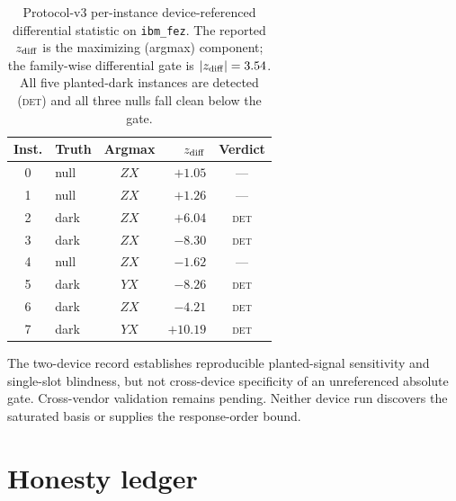 \documentclass[aps,prl,onecolumn,superscriptaddress,nofootinbib]{revtex4-2}
\begin{document}
\begin{table}[t]
\caption{Protocol-v3 per-instance device-referenced differential statistic on \texttt{ibm\_fez}.  The reported $z_{\rm diff}$ is the maximizing (argmax) component; the family-wise differential gate is $|z_{\rm diff}|=3.54$.  All five planted-dark instances are detected (\textsc{det}) and all three nulls fall clean below the gate.}
\label{tab:fez-v3}
\scriptsize
\begin{ruledtabular}
\begin{tabular}{clcrc}
Inst. & Truth & Argmax & $z_{\rm diff}$ & Verdict\\
\hline
0 & null & $ZX$ & $+1.05$ & ---\\
1 & null & $ZX$ & $+1.26$ & ---\\
2 & dark & $ZX$ & $+6.04$ & \textsc{det}\\
3 & dark & $ZX$ & $-8.30$ & \textsc{det}\\
4 & null & $ZX$ & $-1.62$ & ---\\
5 & dark & $YX$ & $-8.26$ & \textsc{det}\\
6 & dark & $ZX$ & $-4.21$ & \textsc{det}\\
7 & dark & $YX$ & $+10.19$ & \textsc{det}\\
\end{tabular}
\end{ruledtabular}
\end{table}

The two-device record establishes reproducible planted-signal sensitivity and single-slot blindness, but not cross-device specificity of an unreferenced absolute gate.  Cross-vendor validation remains pending.  Neither device run discovers the saturated basis or supplies the response-order bound.

\section{Honesty ledger}
\label{sec:honesty}
\end{document}
